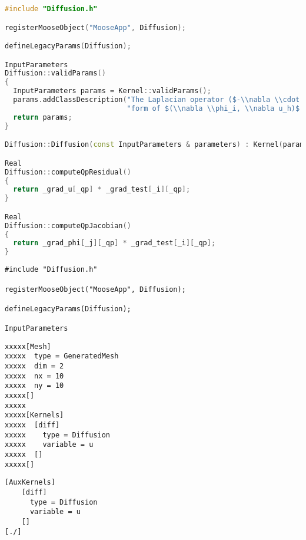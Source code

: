 \begin{lstlisting}[language=C++,]
#include "Diffusion.h"

registerMooseObject("MooseApp", Diffusion);

defineLegacyParams(Diffusion);

InputParameters
Diffusion::validParams()
{
  InputParameters params = Kernel::validParams();
  params.addClassDescription("The Laplacian operator ($-\\nabla \\cdot \\nabla u$), with the weak "
                             "form of $(\\nabla \\phi_i, \\nabla u_h)$.");
  return params;
}

Diffusion::Diffusion(const InputParameters & parameters) : Kernel(parameters) {}

Real
Diffusion::computeQpResidual()
{
  return _grad_u[_qp] * _grad_test[_i][_qp];
}

Real
Diffusion::computeQpJacobian()
{
  return _grad_phi[_j][_qp] * _grad_test[_i][_qp];
}
\end{lstlisting}

\begin{verbatim}
#include "Diffusion.h"

registerMooseObject("MooseApp", Diffusion);

defineLegacyParams(Diffusion);

InputParameters
\end{verbatim}

\begin{verbatim}
xxxxx[Mesh]
xxxxx  type = GeneratedMesh
xxxxx  dim = 2
xxxxx  nx = 10
xxxxx  ny = 10
xxxxx[]
xxxxx
xxxxx[Kernels]
xxxxx  [diff]
xxxxx    type = Diffusion
xxxxx    variable = u
xxxxx  []
xxxxx[]
\end{verbatim}

\begin{verbatim}
[AuxKernels]
    [diff]
      type = Diffusion
      variable = u
    []
[./]
\end{verbatim}

